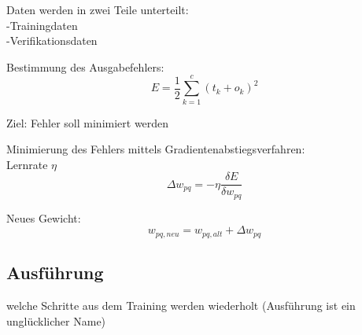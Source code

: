  Daten werden in zwei Teile unterteilt:
 \\-Trainingdaten
 \\-Verifikationsdaten
 
 
 Bestimmung des Ausgabefehlers:
\begin{equation}
E = \frac{1}{2} \sum_{k=1}^{c}(t_{k}+o_{k})^2
\end{equation}

Ziel: Fehler soll minimiert werden

Minimierung des Fehlers mittels Gradientenabstiegsverfahren:
\\Lernrate $\eta$
\begin{equation}
\Delta w_{pq}=-\eta \frac{\delta E}{\delta w_{pq}}
\end{equation}

Neues Gewicht:
\begin{equation}
w_{pq, neu}=w_{pq, alt}+\Delta w_{pq}
\end{equation}


\subsection{Ausführung}
welche Schritte aus dem Training werden wiederholt
(Ausführung ist ein unglücklicher Name)